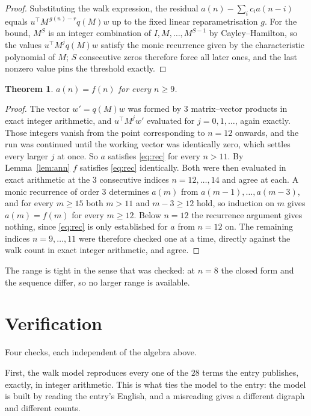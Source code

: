 \documentclass[11pt,a4paper]{article}
\theoremstyle{plain}
\newtheorem{theorem}{Theorem}
\theoremstyle{definition}
\begin{document}
\begin{proof}
Substituting the walk expression, the residual $a(n)-\sum_ic_ia(n-i)$ equals
$u^{\!\top}M^{\,g(n)-r}q(M)w$ up to the fixed linear reparametrisation $g$. For the bound,
$M^{S}$ is an integer combination of $I,M,\dots,M^{S-1}$ by Cayley--Hamilton, so the values
$u^{\!\top}M^{j}q(M)w$ satisfy the monic recurrence given by the characteristic polynomial of
$M$; $S$ consecutive zeros therefore force all later ones, and the last nonzero value pins the
threshold exactly.
\end{proof}

\begin{theorem}
$a(n)=f(n)$ for every $n\ge9$.
\end{theorem}

\begin{proof}
The vector $w'=q(M)w$ was formed by $3$ matrix--vector products in exact integer
arithmetic, and $u^{\!\top}M^{j}w'$ evaluated for $j=0,1,\dots$, again exactly. Those integers
vanish from the point corresponding to $n=12$ onwards, and the run was continued until the
working vector was identically zero, which settles every larger $j$ at once. So $a$ satisfies
\eqref{eq:rec} for every $n>11$. By Lemma~\ref{lem:ann} $f$ satisfies \eqref{eq:rec}
identically. Both were then evaluated in exact arithmetic at the $3$ consecutive indices
$n=12,\dots,14$ and agree at each. A monic recurrence of order $3$
determines $a(m)$ from $a(m-1),\dots,a(m-3)$, and for every $m\ge15$ both
$m>11$ and $m-3\ge12$ hold, so induction on $m$ gives $a(m)=f(m)$ for every
$m\ge12$.
Below $n=12$ the recurrence argument gives nothing, since \eqref{eq:rec} is only
established for $a$ from $n=12$ on. The remaining indices $n=9,\dots,11$ were
therefore checked one at a time, directly against the walk count in exact integer arithmetic,
and agree.
\end{proof}

The range is tight in the sense that was checked: at $n=8$ the closed form and the sequence differ, so no larger range is available.

\section{Verification}

Four checks, each independent of the algebra above.

First, the walk model reproduces every one of the $28$ terms the entry publishes,
exactly, in integer arithmetic. This is what ties the model to the entry: the model is built
by reading the entry's English, and a misreading gives a different digraph and different
counts.
\end{document}
